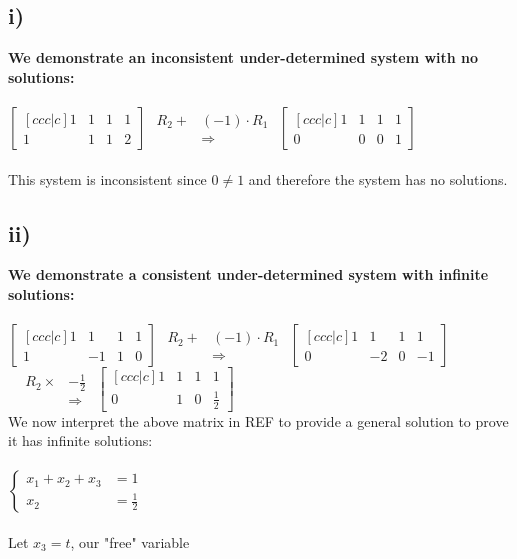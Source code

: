 \documentclass{article}
\begin{document}
\subsection*{i)}
\textbf{We demonstrate an inconsistent under-determined system with no solutions:\\\\}
$
\begin{bmatrix}[ccc|c]
  1 & 1 & 1 & 1\\
  1 & 1 & 1 & 2
\end{bmatrix}
$\;\;\;
$
\begin{aligned} 
R_2 + &(-1)\cdot R_1\\
&\Rightarrow
\end{aligned}
$\;\;\;
$
\begin{bmatrix}[ccc|c]
  1 & 1 & 1 & 1\\
  0 & 0 & 0 & 1
\end{bmatrix}
$\\\\
This system is inconsistent since $0\neq 1$ and therefore the system has no solutions.

\subsection*{ii)}
\textbf{We demonstrate a consistent under-determined system with infinite solutions:\\\\}
$
\begin{bmatrix}[ccc|c]
  1 & 1 & 1 & 1\\
  1 & -1 & 1 & 0
\end{bmatrix}
$\;\;\;
$
\begin{aligned} 
R_2 + &(-1)\cdot R_1\\
&\Rightarrow
\end{aligned}
$\;\;\;
$
\begin{bmatrix}[ccc|c]
  1 & 1 & 1 & 1\\
  0 & -2 & 0 & -1
\end{bmatrix
}$
$\;\;\;
\begin{aligned} 
R_2 \times& -\frac{1}{2}\\
&\Rightarrow
\end{aligned}
$\;\;\;
$
\begin{bmatrix}[ccc|c]
  1 & 1 & 1 & 1\\
  0 & 1 & 0 & \frac{1}{2}
\end{bmatrix}
$
\\We now interpret the above matrix in REF to provide a general solution to prove it has infinite solutions:\\\\
$
\begin{cases}
    x_1+x_2+x_3&=1\\
    x_2&=\frac{1}{2}
\end{cases}
$
\\\\Let $x_3 = t$, our "free" variable
\end{document}
